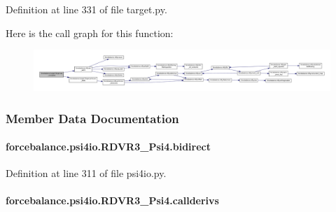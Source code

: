 Definition at line 331 of file target.\-py.



Here is the call graph for this function\-:\nopagebreak
\begin{figure}[H]
\begin{center}
\leavevmode
\includegraphics[width=350pt]{classforcebalance_1_1target_1_1Target_af6099ec09486213869dba2491bd8ea04_cgraph}
\end{center}
\end{figure}




\subsubsection{Member Data Documentation}
\hypertarget{classforcebalance_1_1psi4io_1_1RDVR3__Psi4_ad8462b966b5eecdbed361f33d2f183ea}{
\paragraph[{bidirect}]{\setlength{\rightskip}{0pt plus 5cm}forcebalance.\-psi4io.\-R\-D\-V\-R3\-\_\-\-Psi4.\-bidirect}}\label{classforcebalance_1_1psi4io_1_1RDVR3__Psi4_ad8462b966b5eecdbed361f33d2f183ea}


Definition at line 311 of file psi4io.\-py.

\hypertarget{classforcebalance_1_1psi4io_1_1RDVR3__Psi4_aac0fda10840086df3d343c722addbb3c}{
\paragraph[{callderivs}]{\setlength{\rightskip}{0pt plus 5cm}forcebalance.\-psi4io.\-R\-D\-V\-R3\-\_\-\-Psi4.\-callderivs}}\label{classforcebalance_1_1psi4io_1_1RDVR3__Psi4_aac0fda10840086df3d343c722addbb3c}


